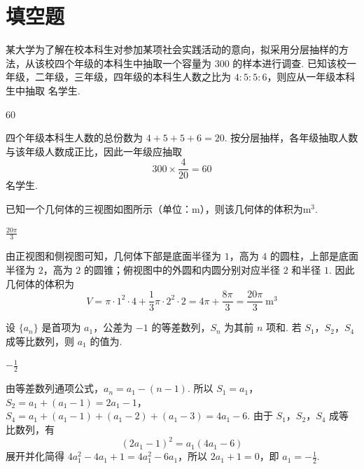 \section{填空题}

\begin{problem}
某大学为了解在校本科生对参加某项社会实践活动的意向，拟采用分层抽样的方法，从该校四个年级的本科生中抽取一个容量为 \(300\) 的样本进行调查. 已知该校一年级，二年级，三年级，四年级的本科生人数之比为 \(4:5:5:6\)，则应从一年级本科生中抽取\fillinblank{} 名学生.
\end{problem}

\begin{answer}
\(60\)
\end{answer}

\begin{solution}
四个年级本科生人数的总份数为 \(4+5+5+6=20\). 按分层抽样，各年级抽取人数与该年级人数成正比，因此一年级应抽取
\[
300\times\frac4{20}=60
\]
名学生.
\end{solution}

\begin{problem}
已知一个几何体的三视图如图所示（单位：\(\mathrm{m}\)），则该几何体的体积为\fillinblank{}\(\mathrm{m}^{3}\).

\end{problem}

\begin{answer}
\(\frac{20\pi}{3}\)
\end{answer}

\begin{solution}
由正视图和侧视图可知，几何体下部是底面半径为 \(1\)，高为 \(4\) 的圆柱，上部是底面半径为 \(2\)，高为 \(2\) 的圆锥；俯视图中的外圆和内圆分别对应半径 \(2\) 和半径 \(1\). 因此几何体的体积为
\[
V=\pi\cdot1^2\cdot4+\frac13\pi\cdot2^2\cdot2=4\pi+\frac{8\pi}{3}=\frac{20\pi}{3}\ \mathrm{m}^{3}
\]
\end{solution}

\begin{problem}
设 \(\{a_{n}\}\) 是首项为 \(a_{1}\)，公差为 \(-1\) 的等差数列，\(S_{n}\) 为其前 \(n\) 项和. 若 \(S_{1}\)，\(S_{2}\)，\(S_{4}\) 成等比数列，则 \(a_{1}\) 的值为\fillinblank{}.
\end{problem}

\begin{answer}
\(-\frac{1}{2}\)
\end{answer}

\begin{solution}
由等差数列通项公式，\(a_n=a_1-(n-1)\). 所以
\(S_1=a_1\)，\(S_2=a_1+(a_1-1)=2a_1-1\)，\(S_4=a_1+(a_1-1)+(a_1-2)+(a_1-3)=4a_1-6\). 由于 \(S_1\)，\(S_2\)，\(S_4\) 成等比数列，有
\[
(2a_1-1)^2=a_1(4a_1-6)
\]
展开并化简得 \(4a_1^2-4a_1+1=4a_1^2-6a_1\)，所以 \(2a_1+1=0\)，即 \(a_1=-\frac12\).
\end{solution}

